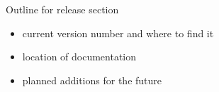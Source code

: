 Outline for release section

\begin{itemize}
\item current version number and where to find it
\item location of documentation
\item planned additions for the future
\end{itemize}
